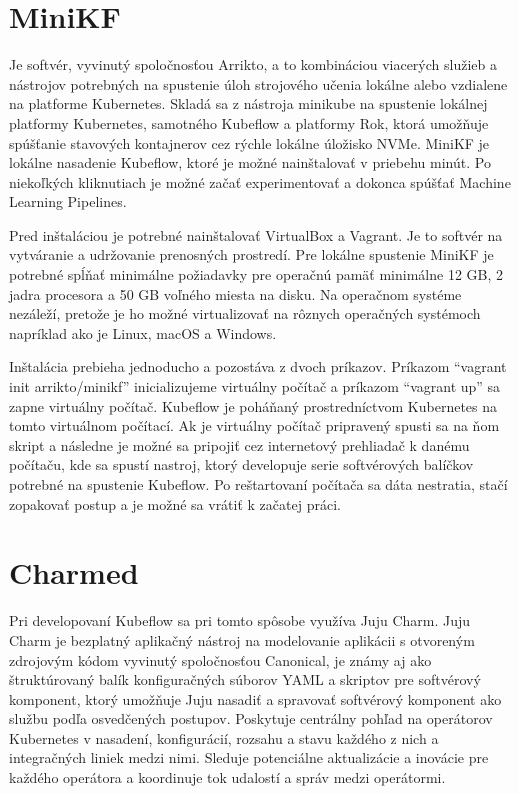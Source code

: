 \section{MiniKF}

Je softvér, vyvinutý spoločnosťou Arrikto, a to kombináciou viacerých služieb a nástrojov potrebných na spustenie úloh strojového učenia lokálne alebo vzdialene na platforme Kubernetes. Skladá sa z nástroja minikube na spustenie lokálnej platformy Kubernetes, samotného Kubeflow a platformy Rok, ktorá umožňuje spúšťanie stavových kontajnerov cez rýchle lokálne úložisko NVMe. MiniKF je lokálne nasadenie Kubeflow, ktoré je možné nainštalovať v priebehu minút. Po niekoľkých kliknutiach je možné začať experimentovať a dokonca spúšťať Machine Learning Pipelines.

Pred inštaláciou je potrebné nainštalovať VirtualBox a Vagrant. Je to softvér na vytváranie a udržovanie prenosných prostredí. Pre lokálne spustenie MiniKF je potrebné spĺňať minimálne požiadavky pre operačnú pamäť minimálne 12 GB, 2 jadra procesora a 50 GB voľného miesta na disku. Na operačnom systéme nezáleží, pretože je ho možné virtualizovať na rôznych operačných systémoch napríklad ako je Linux, macOS a Windows.

Inštalácia prebieha jednoducho a pozostáva z dvoch príkazov. Príkazom “vagrant init arrikto/minikf”  inicializujeme virtuálny počítač a príkazom “vagrant up” sa zapne virtuálny počítač. Kubeflow je poháňaný prostredníctvom Kubernetes na tomto virtuálnom počítací. Ak je virtuálny počítač pripravený spusti sa na ňom skript a následne je možné sa pripojiť cez internetový prehliadač k danému počítaču, kde sa spustí nastroj, ktorý developuje serie softvérových balíčkov potrebné na spustenie Kubeflow. Po reštartovaní počítača sa dáta nestratia, stačí zopakovať postup a je možné sa vrátiť k začatej práci.

\section{Charmed}

Pri developovaní Kubeflow sa pri tomto spôsobe využíva Juju Charm. Juju Charm je bezplatný aplikačný nástroj na modelovanie aplikácii s otvoreným zdrojovým kódom vyvinutý spoločnosťou Canonical, je známy aj ako štruktúrovaný balík konfiguračných súborov YAML a skriptov pre softvérový komponent, ktorý umožňuje Juju nasadiť a spravovať softvérový komponent ako službu podľa osvedčených postupov. Poskytuje centrálny pohľad na operátorov Kubernetes v nasadení, konfigurácií, rozsahu a stavu každého z nich a integračných liniek medzi nimi. Sleduje potenciálne aktualizácie a inovácie pre každého operátora a koordinuje tok udalostí a správ medzi operátormi.

